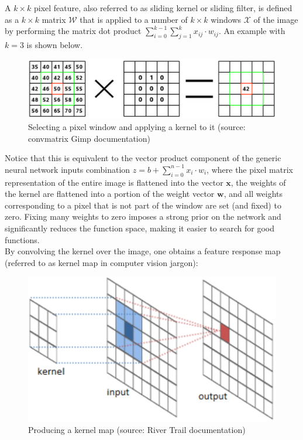 \documentclass[a4paper,11pt]{article}
\begin{document}
A $k \times k$ pixel feature, also referred to as sliding kernel or sliding filter, is defined as a $k \times k$ matrix $\mathcal{W}$ that is applied to a number of $k \times k$ windows $\mathcal{X}$ of the image by performing  the matrix dot product $\sum_{i=0}^{k-1} \sum_{j=1}^{k} x_{ij} \cdot w_{ij}$. An example with $k=3$ is shown below.

\begin{figure}[h!]
	\centering
	\includegraphics[scale=0.3]{images/window_x_kernel.png}
	\caption{Selecting a pixel window and applying a kernel to it (source: convmatrix Gimp documentation)}
\end{figure}

Notice that this is equivalent to the vector product component of the generic neural network inputs combination $z = b + \sum\limits_{i=0}^{n-1} x_{i}\cdot w_{i}$, where the pixel matrix representation of the entire image is flattened into the vector $\textbf{x}$, the weights of the kernel are flattened into a portion of the weight vector $\textbf{w}$, and all weights corresponding to a pixel that is not part of the window are set (and fixed) to zero. Fixing many weights to zero imposes a strong prior on the network and significantly reduces the function space, making it easier to search for good functions. \\

By convolving the kernel over the image, one obtains a feature response map (referred to as kernel map in computer vision jargon):

\begin{figure}[h!]
	\centering
	\includegraphics[scale=0.3]{images/kernel_map.png}
	\caption{Producing a kernel map (source: River Trail documentation)}
\end{figure}
\end{document}
